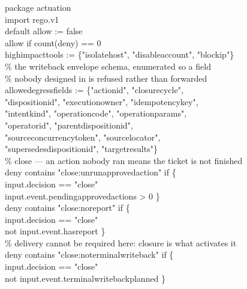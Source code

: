 \documentclass[acmsmall,manuscript,review,anonymous]{acmart}
\renewcommand{\_}{\discretionary{\textunderscore}{}{\textunderscore}}
\begin{document}
\begin{flushleft}\scriptsize\ttfamily\linespread{0.94}\selectfont
package actuation\\
import rego.v1\\
\vspace{1pt}
default allow := false\\
allow if count(deny) == 0\\
\vspace{1pt}
high\_impact\_tools := \{"isolate\_host", "disable\_account", "block\_ip"\}\\
\vspace{1pt}
\% the writeback envelope schema, enumerated so a field\\
\% nobody designed in is refused rather than forwarded\\
allowed\_egress\_fields := \{"action\_id", "closure\_cycle",\\
\quad "disposition\_id", "execution\_owner", "idempotency\_key",\\
\quad "intent\_kind", "operation\_code", "operation\_params",\\
\quad "operator\_id", "parent\_disposition\_id",\\
\quad "source\_concurrency\_token", "source\_locator",\\
\quad "supersedes\_disposition\_id", "target\_results"\}\\
\vspace{1pt}
\% close --- an action nobody ran means the ticket is not finished\\
deny contains "close:unrun\_approved\_action" if \{\\
\quad input.decision == "close"\\
\quad input.event.pending\_approved\_actions > 0 \}\\
\vspace{1pt}
deny contains "close:no\_report" if \{\\
\quad input.decision == "close"\\
\quad not input.event.has\_report \}\\
\vspace{1pt}
\% delivery cannot be required here: closure is what activates it\\
deny contains "close:no\_terminal\_writeback" if \{\\
\quad input.decision == "close"\\
\quad not input.event.terminal\_writeback\_planned \}\\
\vspace{1pt}

\end{flushleft}
\end{document}
